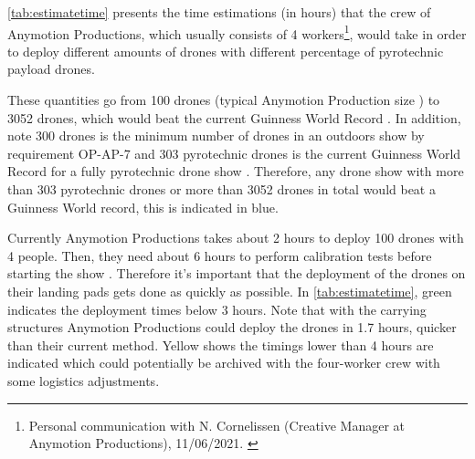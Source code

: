 \autoref{tab:estimatetime} presents the time estimations (in hours) that the crew of Anymotion Productions, which usually consists of 4 workers\footnote{Personal communication with N. Cornelissen (Creative Manager at Anymotion Productions),  11/06/2021. \label{APemailJune}}, would take in order to deploy different amounts of drones with different percentage of pyrotechnic payload drones. 

These quantities go from 100 drones (typical Anymotion Production size ) to 3052 drones, which would beat the current Guinness World Record \cite{worldrecords}. In addition, note 300 drones is the minimum number of drones in an outdoors show by requirement OP-AP-7 and 303 pyrotechnic drones is the current Guinness World Record for a fully pyrotechnic drone show \cite{guinnesspyro}. Therefore, any drone show with more than 303 pyrotechnic drones or more than 3052 drones in total would beat a Guinness World record, this is indicated in blue.

Currently Anymotion Productions takes about 2 hours to deploy 100 drones with 4 people. Then, they need about 6 hours to perform calibration tests before starting the show . Therefore it's important that the deployment of the drones on their landing pads gets done as quickly as possible. In \autoref{tab:estimatetime}, green indicates the deployment times below 3 hours. Note that with the carrying structures Anymotion Productions could deploy the drones in 1.7 hours, quicker than their current method. Yellow shows the timings lower than 4 hours are indicated which could potentially be archived with the four-worker crew with some logistics adjustments.

